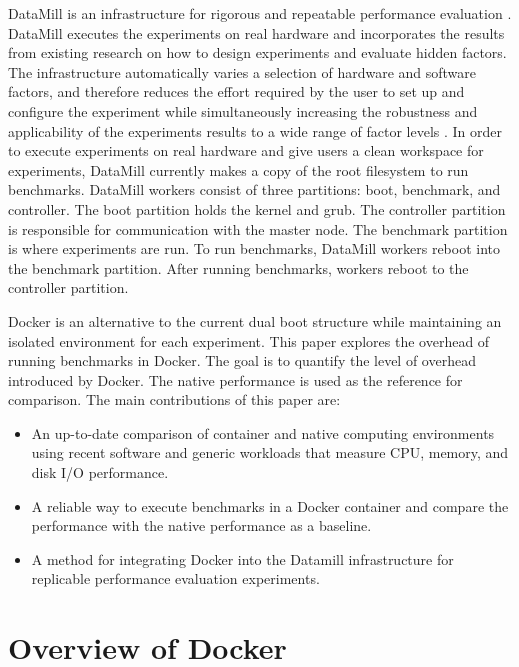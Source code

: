 \documentclass[11pt]{article}
\begin{document}
DataMill is an infrastructure for rigorous and repeatable performance evaluation \cite{augusto}. DataMill executes the experiments on real hardware and incorporates the results from existing research on how to design experiments and evaluate hidden factors. The infrastructure automatically varies a selection of hardware and software factors, and therefore reduces the effort required by the user to set up and configure the experiment while simultaneously increasing the robustness and applicability of the experiments results to a wide range of factor levels \cite{augusto}. In order to execute experiments on real hardware and give users a clean workspace for experiments, DataMill currently makes a copy of the root filesystem to run benchmarks. DataMill workers consist of three partitions: boot, benchmark, and controller. The boot partition holds the kernel and grub. The controller partition is responsible for communication with the master node. The benchmark partition is where experiments are run. To run benchmarks, DataMill workers reboot into the benchmark partition. After running benchmarks, workers reboot to the controller partition.

Docker is an alternative to the current dual boot structure while maintaining an isolated environment for each experiment. This paper explores the overhead of running benchmarks in Docker. The goal is to quantify the level of overhead introduced by Docker. The native performance is used as the reference for comparison. The main contributions of this paper are:
\begin{itemize}
	\item An up-to-date comparison of container and native computing environments using recent software and generic workloads that measure CPU, memory, and disk I/O performance.
	\item A reliable way to execute benchmarks in a Docker container and compare the performance with the native performance as a baseline.
	\item A method for integrating Docker into the Datamill infrastructure for replicable performance evaluation experiments.
\end{itemize}

\section{Overview of Docker}
\end{document}
